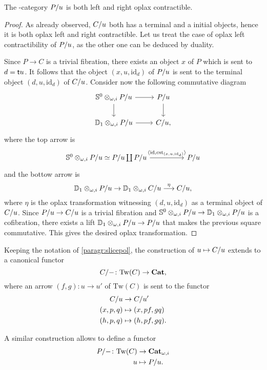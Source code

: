 \documentclass{amsart}
\newcommand{\Tw}[1]{\mathrm{Tw}(#1)}
\newcommand{\id}{\mathrm{id}}
\renewcommand{\tge}[1]{\target{} #1}
\begin{document}
  \begin{lemma}\label{lemma:oplaxterm}
  The \oo\nbd-category $P/u$ is both left and right oplax contractible.
  \end{lemma}
  \begin{proof}
    As already observed, $C/u$ both has a terminal and a initial
    objects, hence it is both oplax left and right contractible. Let us treat the case of
    oplax left contractibility of $P/u$, as the other one can be
    deduced by duality.

    Since $P \to C$ is a trivial fibration, there exists an object $x$
    of $P$ which is sent to $d=\tge{u}$. It follows that the object
    $(x,u,\id_d)$ of $P/u$ is sent to the terminal object
    $(d,u,\id_d)$ of $C/u$. Consider now the following
    commutative diagram
    \[
      \begin{tikzcd}
        \Sph{0}\tens{\omega,i}\tr{P}{u} \ar[r] \ar[d] & \tr{P}{u} \ar[d]\\
        \Dsk{1}\tens{\omega,i}\tr{P}{u} \ar[r] & \tr{C}{u},
      \end{tikzcd}
    \]
    where the top arrow is
    \[
      \begin{tikzcd}[column sep=huge]
      \Sph{0}\tens{\omega,i}\tr{P}{u} \simeq \tr{P}{u}\coprod\tr{P}{u}
      \ar[r,"{\langle\id,\mathrm{cst}_{(x,u,\id_d)}\rangle}"]&\tr{P}{u}
      \end{tikzcd}
    \]
    and the bottow arrow is
    \[
      \mathbb{D}_{1}\otimes_{\omega,i}P/u \to
      \mathbb{D}_{1}\otimes_{\omega,i}C/u \overset{\eta}{\longrightarrow}
       C/u,
     \]
     where $\eta$ is the oplax transformation witnessing $(d,u,\id_d)$
     as a terminal object of $C/u$. 
    Since $P/u\to C/u$ is a trivial fibration and
    $\mathbb{S}^{0}\otimes_{\omega,i}P/u \to \mathbb{D}_{1}\otimes_{\omega,i}P/u$ is a
    cofibration, there exists a lift $\mathbb{D}_{1}\otimes_{\omega,i}P/u
    \to P/u$ that makes the previous square commutative. This
    gives the desired oplax transformation.
  \end{proof}
  \begin{paragr}
      Keeping the notation of \ref{paragr:slicepol}, the construction of $u\mapsto C/u$ extends to a canonical functor
    \[
        \tr{C}{-}\colon \Tw{C} \to \Cat,
      \]
      where an arrow $(f,g) \colon u \to u'$ of $\Tw{C}$ is sent to the functor
      \[
        \begin{aligned}
          C/u &\to C/u'\\
          (x,p,q) &\mapsto (x,pf,gq)\\
          (h,p,q) &\mapsto (h,pf,gq).
        \end{aligned}
      \]
      
    A similar construction allows to define a functor
    \[
      \begin{aligned}
       \tr{P}{-}\colon \Tw{C} &\to \opCat{i} \\
        u &\mapsto \tr{P}{u}.
      \end{aligned}
    \]
  \end{paragr}
\end{document}
